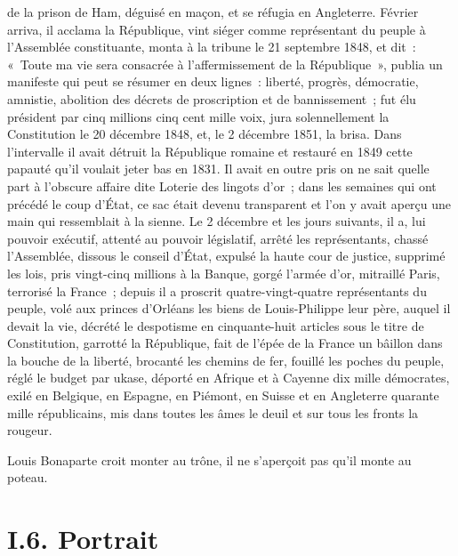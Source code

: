\documentclass[french,twoside]{book} %
\begin{document}
de la prison de Ham, déguisé en maçon, et se réfugia en Angleterre. Février arriva, il acclama la République, vint siéger comme représentant du peuple à l’Assemblée constituante, monta à la tribune le 21 septembre 1848, et dit : « Toute ma vie sera consacrée à l’affermissement de la République », publia un manifeste qui peut se résumer en deux lignes : liberté, progrès, démocratie, amnistie, abolition des décrets de proscription et de bannissement ; fut élu président par cinq millions cinq cent mille voix, jura solennellement la Constitution le 20 décembre 1848, et, le 2 décembre 1851, la brisa. Dans l’intervalle il avait détruit la République romaine et restauré en 1849 cette papauté qu’il voulait jeter bas en 1831. Il avait en outre pris on ne sait quelle part à l’obscure affaire dite Loterie des lingots d’or ; dans les semaines qui ont précédé le coup d’État, ce sac était devenu transparent et l’on y avait aperçu une main qui ressemblait à la sienne. Le 2 décembre et les jours suivants, il a, lui pouvoir exécutif, attenté au pouvoir législatif, arrêté les représentants, chassé l’Assemblée, dissous le conseil d’État, expulsé la haute cour de justice, supprimé les lois, pris vingt-cinq millions à la Banque, gorgé l’armée d’or, mitraillé Paris, terrorisé la France ; depuis il a proscrit quatre-vingt-quatre représentants du peuple, volé aux princes d’Orléans les biens de Louis-Philippe leur père, auquel il devait la vie, décrété le despotisme en cinquante-huit articles sous le titre de Constitution, garrotté la République, fait de l’épée de la France un bâillon dans la bouche de la liberté, brocanté les chemins de fer, fouillé les poches du peuple, réglé le budget par ukase, déporté en Afrique et à Cayenne dix mille démocrates, exilé en Belgique, en Espagne, en Piémont, en Suisse et en Angleterre quarante mille républicains, mis dans toutes les âmes le deuil et sur tous les fronts la rougeur.\par
Louis Bonaparte croit monter au trône, il ne s’aperçoit pas qu’il monte au poteau.

\section[{I.6. Portrait}]{I.6. Portrait}
\end{document}

